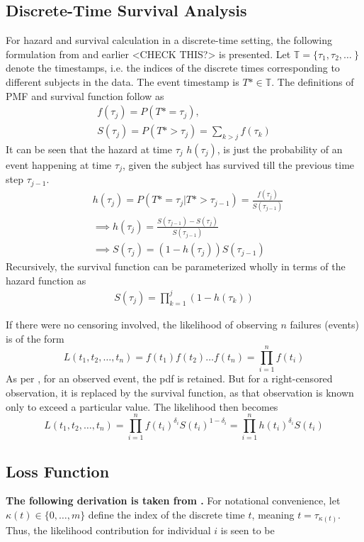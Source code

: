 \documentclass[%
 reprint,
 amsmath,amssymb,
 aps,
]{revtex4-2}
\begin{document}
\subsection{\label{discrete}Discrete-Time Survival Analysis}
For hazard and survival calculation in a discrete-time setting, the following formulation from \cite{kvamme_continuous_2019} and earlier \cite{Gensheimer_Narasimhan_2019}<CHECK THIS?> is presented. Let $\mathbb{T} = \{\tau_1, \tau_2, \ldots\ \}$ denote the timestamps, i.e. the indices of the discrete times corresponding to different subjects in the data. The event timestamp is $T*\in\mathbb{T}$. The definitions of PMF and survival function follow as
\begin{gather*}
f(\tau_j) = P(T* = \tau_j),\\
S(\tau_j) = P(T* >\tau_j) = \sum_{k>j}f(\tau_k)
\end{gather*}
It can be seen that the hazard at time $\tau_j$ $h(\tau_j)$, is just the probability of an event happening at time $\tau_j$, given the subject has survived till the previous time step $\tau_{j-1}$. 
\begin{align}
&h(\tau_j) = P(T* = \tau_j | T* > \tau_{j-1}) = \frac{f(\tau_j)}{S(\tau_{j-1})} \label{haz_cond_proba}\\
&\implies  h(\tau_j) = \frac{S(\tau_{j-1}) - S(\tau_j)}{S(\tau_{j-1})}\\
&\implies S(\tau_j) = (1 - h(\tau_j))S(\tau_{j-1})
\end{align}
Recursively, the survival function can be parameterized wholly in terms of the hazard function as
\begin{align}
S(\tau_j) = \prod_{k=1}^{j}(1 - h(\tau_k)) \label{cum_haz=surv}
\end{align}

If there were no censoring involved, the likelihood of observing $n$ failures (events) is of the form
\[
L(t_1 , t_2 , \ldots , t_n) = f(t_1)f(t_2)\ldots f(t_n)=\prod^{n}_{i=1}f(t_i)
\]
As per \cite{Moore_2016}, for an observed event, the pdf is retained. But for a right-censored observation, it is replaced by the survival function, as that observation is known only to exceed a particular value. The likelihood then becomes
\[
L(t_1 , t_2 , \ldots , t_n) = \prod^{n}_{i=1}f(t_i)^{\delta_i}S(t_i)^{1-\delta_i}=\prod^{n}_{i=1}h(t_i)^{\delta_i}S(t_i)
\]

\subsection{\label{loss}Loss Function}
\textbf{The following derivation is taken from \cite{kvamme_continuous_2019}.} For notational convenience, let $\kappa(t) \in \{0, \ldots , m\}$ define the index of the discrete time $t$, meaning $t = \tau_{\kappa(t)}$. Thus, the likelihood contribution for individual $i$ is seen to be 
\end{document}
